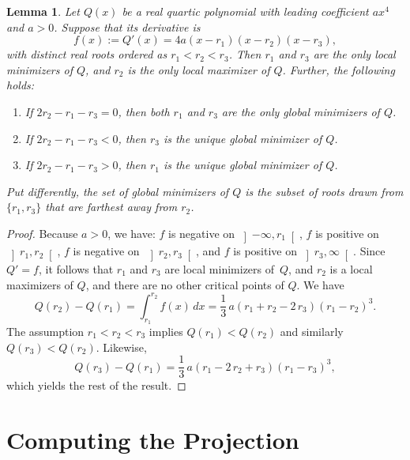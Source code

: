 \documentclass[11pt]{article}
\newtheorem{lemma}[theorem]{Lemma}
\begin{document}
\begin{lemma}\label{l:Alicante1}
Let $Q(x)$ be a real quartic polynomial with leading coefficient 
$ax^4$ and $a>0$. Suppose that its derivative is
\begin{equation*}
f(x) := Q'(x) = 4a(x-r_1)(x-r_2)(x-r_3),
\end{equation*}
with distinct real roots ordered as $r_1<r_2<r_3$. 
Then $r_1$ and $r_3$ are the only local minimizers of $Q$, and $r_2$ is the only local maximizer of $Q$. Further, the following holds:
\begin{enumerate}
\item 
If $2r_2 - r_1-r_3=0$, then both $r_1$ and $r_3$ are the only global minimizers of $Q$.
\item
If $2r_2 - r_1-r_3<0$, then $r_3$ is the unique global minimizer of $Q$.
\item 
If $2r_2 -r_1-r_3>0$, then $r_1$ is the unique global minimizer of $Q$.
\end{enumerate}
Put differently, the set of global minimizers of $Q$ is the subset of roots 
drawn from $\{r_1,r_3\}$ that are farthest away from $r_2$.
\end{lemma}
\begin{proof}
Because $a>0$, we have: $f$ is negative on $\left]-\infty,r_1\right[$,
$f$ is positive on $\left]r_1,r_2\right[$, 
$f$ is negative on~$\left]r_2,r_3\right[$, 
and $f$ is positive on $\left]r_3,\infty\right[$. 
Since $Q'=f$, it follows that 
$r_1$ and $r_3$ are local minimizers of~$Q$, and $r_2$ is a local maximizers of $Q$,
and there are no other critical points of $Q$. 
We have 
\begin{equation*}
Q(r_2)-Q(r_1) = \int_{r_1}^{r_2}f(x)\,dx= \frac{1}{3} \, a {\left(r_{1} + r_{2} - 2 \, r_{3}\right)} {\left(r_{1} - r_{2}\right)}^{3}.
\end{equation*}
The assumption $r_1<r_2<r_3$ implies $Q(r_1)<Q(r_2)$ and similarly $Q(r_3)<Q(r_2)$. Likewise,
\begin{equation*}
Q(r_3)-Q(r_1)
=
\frac{1}{3} \, a {\left(r_{1} - 2 \, r_{2} + r_{3}\right)} {\left(r_{1} - r_{3}\right)}^{3},
\end{equation*}
which yields the rest of the result. 
\end{proof}



\section{Computing the Projection}
\end{document}
